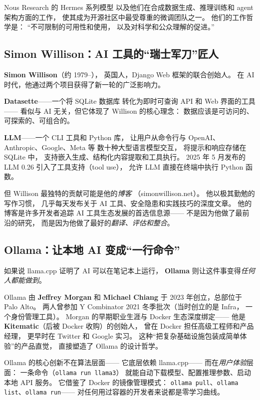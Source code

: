 Nous Research 的 Hermes 系列模型
以及他们在合成数据生成、推理训练和
agent 架构方面的工作，
使其成为开源社区中最受尊重的微调团队之一。
他们的工作哲学是：
``不可限制的可用性和使用，
以及对科学和公众理解的促进。''

\subsection{Simon Willison：AI 工具的``瑞士军刀''匠人}

\textbf{Simon Willison}（约 1979--），
英国人，Django Web 框架的联合创始人。
在 AI 时代，他通过两个项目获得了新一轮的广泛影响力。

\textbf{Datasette}——一个将 SQLite 数据库
转化为即时可查询 API 和 Web 界面的工具——
看似与 AI 无关，但它体现了 Willison 的核心理念：
数据应该是可访问的、可探索的、可组合的。

\textbf{LLM}——一个 CLI 工具和 Python 库，
让用户从命令行与 OpenAI、Anthropic、Google、Meta 等
数十种大型语言模型交互，
将提示和响应存储在 SQLite 中，
支持嵌入生成、结构化内容提取和工具执行。
2025 年 5 月发布的 LLM 0.26
引入了工具支持（tool use），
允许 LLM 直接在终端中执行 Python 函数。

但 Willison 最独特的贡献可能是他的\emph{博客}
（simonwillison.net）。
他以极其勤勉的写作习惯，
几乎每天发布关于 AI 工具、安全隐患和实践技巧的深度文章。
他的博客是许多开发者追踪 AI 工具生态发展的首选信息源——
不是因为他做了最前沿的研究，
而是因为他做了最好的\emph{翻译、评估和整合}。

\subsection{Ollama：让本地 AI 变成``一行命令''}

如果说 llama.cpp 证明了 AI 可以在笔记本上运行，
\textbf{Ollama} 则让这件事变得\emph{任何人都能做到}。

Ollama 由 \textbf{Jeffrey Morgan} 和 \textbf{Michael Chiang}
于 2023 年创立，总部位于 Palo Alto。
两人曾参加 Y Combinator 2021 冬季批次（当时创立的是 Infra，
一个身份管理工具）。
Morgan 的早期职业生涯与 Docker 生态深度绑定——
他是 \textbf{Kitematic}（后被 Docker 收购）的创始人，
曾在 Docker 担任高级工程师和产品经理，
更早时在 Twitter 和 Google 实习。
这种``把复杂基础设施包装成简单体验''的产品直觉，
直接塑造了 Ollama 的设计哲学。

Ollama 的核心创新不在算法层面——
它底层依赖 llama.cpp——
而在\emph{用户体验}层面：
一条命令（\texttt{ollama run llama3}）
就能自动下载模型、配置推理参数、启动本地 API 服务。
它借鉴了 Docker 的镜像管理模式：
\texttt{ollama pull}、\texttt{ollama list}、\texttt{ollama run}——
对任何用过容器的开发者来说都是零学习曲线。

